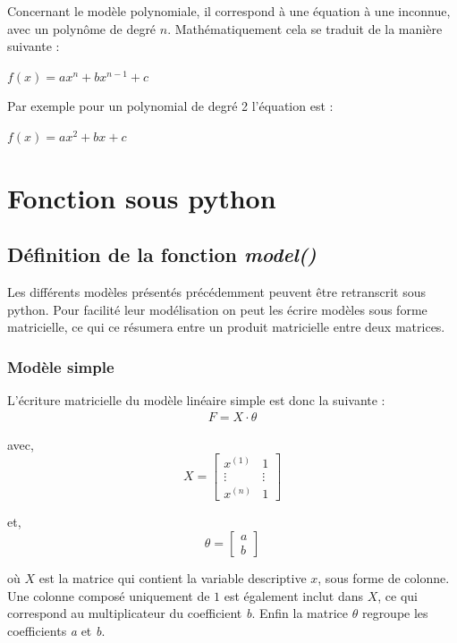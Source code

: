 \documentclass[french]{article}
\begin{document}
Concernant le modèle polynomiale, il correspond à une équation à une inconnue, avec un polynôme de degré $n$. Mathématiquement cela se traduit de la manière suivante :

\begin{center}
    $f(x) = ax^{n} + bx^{n-1} + c $
\end{center}

\noindent Par exemple pour un polynomial de degré 2 l'équation est :

\begin{center}
    $f(x) = ax^{2} + bx + c $
\end{center}

\newpage

\section{Fonction sous python}

\subsection{Définition de la fonction \textit{model()}}

Les différents modèles présentés précédemment peuvent être retranscrit sous python. Pour facilité leur modélisation on peut les écrire modèles sous forme matricielle, ce qui ce résumera entre un produit matricielle entre deux matrices.

\subsubsection{Modèle simple}

\noindent L'écriture matricielle du modèle linéaire simple est donc la suivante :
\begin{align*}
    F = X \cdot \theta
\end{align*}

\noindent avec, 
$$X = \begin{bmatrix}
    x^{(1)} & 1 \\
    \vdots & \vdots \\
    x^{(n)} & 1
\end{bmatrix}$$

\noindent et, 
$$\theta = \begin{bmatrix}
    a \\
    b
\end{bmatrix}$$

\noindent où $X$ est la matrice qui contient la variable descriptive $x$, sous forme de colonne. Une colonne composé uniquement de $1$ est également inclut dans $X$, ce qui correspond au multiplicateur du coefficient \textit{b}. Enfin la matrice $\theta$ regroupe les coefficients \textit{a} et \textit{b}.
\end{document}
